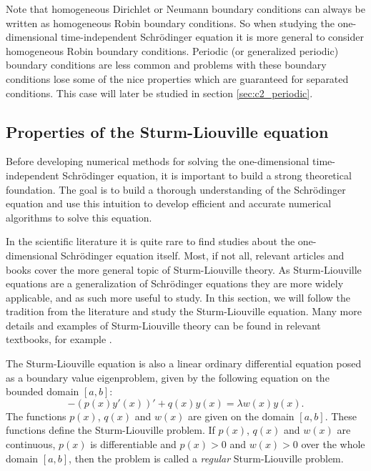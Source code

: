 Note that homogeneous Dirichlet or Neumann boundary conditions can always be written as homogeneous Robin boundary conditions. So when studying the one-dimensional time-independent Schrödinger equation it is more general to consider homogeneous Robin boundary conditions. Periodic (or generalized periodic) boundary conditions are less common and problems with these boundary conditions lose some of the nice properties which are guaranteed for separated conditions. This case will later be studied in section \ref{sec:c2_periodic}.

\subsection{Properties of the Sturm-Liouville equation}

Before developing numerical methods for solving the one-dimensional time-independent Schrödinger equation, it is important to build a strong theoretical foundation. The goal is to build a thorough understanding of the Schrödinger equation and use this intuition to develop efficient and accurate numerical algorithms to solve this equation.

In the scientific literature it is quite rare to find studies about the one-dimensional Schrödinger equation itself. Most, if not all, relevant articles and books cover the more general topic of Sturm-Liouville theory. As Sturm-Liouville equations are a generalization of Schrödinger equations they are more widely applicable, and as such more useful to study. In this section, we will follow the tradition from the literature and study the Sturm-Liouville equation. Many more details and examples of Sturm-Liouville theory can be found in relevant textbooks, for example \cite[Chapter~5]{sagan_boundary_1961}.

The Sturm-Liouville equation is also a linear ordinary differential equation posed as a boundary value eigenproblem, given by the following equation on the bounded domain $[a, b]$:
\begin{equation}\label{equ:c2_sturm_liovuille_equation}
    -(p(x) y'(x))' + q(x) y(x) = \lambda w(x) y(x)\text{.}
\end{equation}
The functions $p(x)$, $q(x)$ and $w(x)$ are given on the domain $[a, b]$. These functions define the Sturm-Liouville problem. If $p(x)$, $q(x)$ and $w(x)$ are continuous, $p(x)$ is differentiable and $p(x) > 0$ and $w(x) > 0$ over the whole domain $[a, b]$, then the problem is called a \emph{regular} Sturm-Liouville problem.

